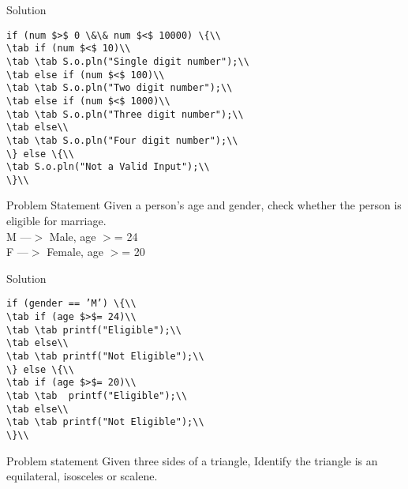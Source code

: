 \documentclass[aspectratio=169,14pt,usenames,dvipsnames]{beamer}
\newcommand\tab[1][1cm]{\hspace*{#1}}
\begin{document}
\begin{frame}{Solution}
\begin{lstlisting}
if (num $>$ 0 \&\& num $<$ 10000) \{\\
\tab if (num $<$ 10)\\
\tab \tab S.o.pln("Single digit number");\\
\tab else if (num $<$ 100)\\
\tab \tab S.o.pln("Two digit number");\\
\tab else if (num $<$ 1000)\\
\tab \tab S.o.pln("Three digit number");\\
\tab else\\
\tab \tab S.o.pln("Four digit number");\\
\} else \{\\
\tab S.o.pln("Not a Valid Input");\\
\}\\
\end{lstlisting}
\end{frame}

\begin{frame}{Problem Statement}
Given a person’s age and gender, check
whether the person is eligible for marriage.\\
M ---$>$ Male, age $>$= 24\\
F ---$>$ Female, age $>$= 20\\
\end{frame}

\begin{frame}{Solution}
\begin{lstlisting}
if (gender == ’M’) \{\\
\tab if (age $>$= 24)\\
\tab \tab printf("Eligible");\\
\tab else\\
\tab \tab printf("Not Eligible");\\
\} else \{\\
\tab if (age $>$= 20)\\
\tab \tab  printf("Eligible");\\
\tab else\\
\tab \tab printf("Not Eligible");\\
\}\\
\end{lstlisting}
\end{frame}

\begin{frame}{Problem statement}
Given three sides of a triangle, Identify the
triangle is an equilateral, isosceles or scalene.
\end{frame}
\end{document}
